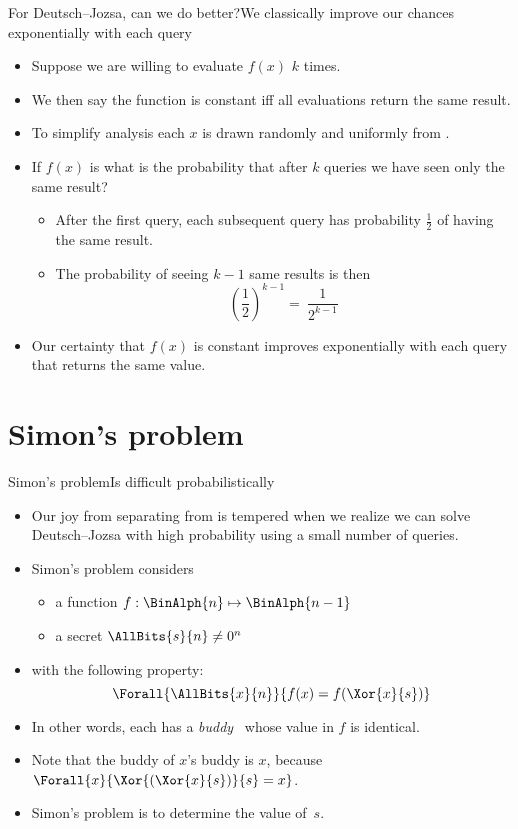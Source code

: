 \begin{frame}{For Deutsch--Jozsa, can we do better?}{We classically improve our chances exponentially with each query}

\begin{itemize}[<+->]
    \item Suppose we are willing to evaluate $f(x)$ $k$ times.
    \item We then say the function is constant iff all evaluations return the same result.
    \item To simplify analysis each $x$ is drawn randomly and uniformly from .
    \item If $f(x)$ is  what is the probability that after $k$ queries we have seen only the same result?
    \begin{itemize}
        \item After the first query, each subsequent query has probability $\frac{1}{2}$ of having the same result.
        \item The probability of seeing $k-1$ same results is then \[\left(\frac{1}{2}\right)^{k-1} =\ \frac{1}{2^{k-1}}\]
    \end{itemize}
    \item Our certainty that $f(x)$ is constant improves exponentially with each query that returns the same value.
\end{itemize}
    
\end{frame}

\section*{Simon's problem}

\begin{frame}{Simon's problem}{Is difficult probabilistically}
\begin{itemize}[<+->]
    \item Our joy from separating  from  is tempered when we realize we can solve Deutsch--Jozsa with high probability using a small number of queries.
    \item Simon's problem considers 
    \begin{itemize}
        \item a function $f: \BinAlph{n}\mapsto \BinAlph{n-1}$
        \item a secret $\AllBits{s}{n} \not= 0^{n}$
    \end{itemize}
    \item with the following property:
    \[\Forall{\AllBits{x}{n}}{f(x)=f(\Xor{x}{s})} \]
    \item In other words, each  has a \emph{buddy}~ whose value in $f$ is identical.
    \item Note that the buddy of $x$'s buddy is $x$, because
    $\Forall{x}{\Xor{(\Xor{x}{s})}{s}=x}$.
    \item \alert{Simon's problem is to determine the value of~$s$.}
\end{itemize}
\end{frame}

